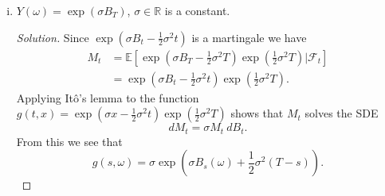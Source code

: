 \documentclass[11pt,letterpaper]{report}
\newcommand{\reals}{\mathbb{R}}
\newcommand{\mcal}[1]{\mathcal{#1}}
\newcommand{\E}{\mathbb{E}}
\newenvironment{solution}
{\begin{proof}[Solution]}
{\end{proof}}
\begin{document}
\begin{enumerate}[(a)]
\begin{enumerate}[(i)]
		\item $Y(\omega) = \exp(\sigma B_T)$, $\sigma \in \reals$ is a constant.
		\begin{solution}
			Since $\exp(\sigma B_t - \frac{1}{2}\sigma^2t)$ is a martingale we have
			\begin{align*}
				M_t &= \E\left[\exp(\sigma B_T-\frac{1}{2}\sigma^2T)\exp(\frac{1}{2}\sigma^2T)|\mcal{F}_t \right]\\
				&= \exp(\sigma B_t-\frac{1}{2}\sigma^2t)\exp(\frac{1}{2}	\sigma^2T).
			\end{align*}
			Applying It\^o's lemma to the function $g(t, x) = \exp(\sigma x - \frac{1}{2}\sigma^2t)\exp(\frac{1}{2}\sigma^2T)$ shows that $M_t$ solves the SDE
			\[
			dM_t = \sigma M_t\ dB_t.
			\]
			From this we see that
			\[
			g(s, \omega) = \sigma\exp\left(\sigma B_s(\omega) + \frac{1}{2}\sigma^2(T-s) \right).
			\]
		\end{solution}
	\end{enumerate}
\end{enumerate}
\end{document}
